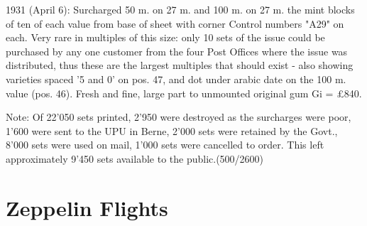 \documentclass[justified]{tufte-book}
\begin{document}






















1931 (April 6): Surcharged 50 m. on 27 m. and 100 m. on 27 m. the mint blocks of ten of each value from base of sheet with corner Control numbers "A29" on each. Very rare in multiples of this size: only 10 sets of the issue could be purchased by any one customer from the four Post Offices where the issue was distributed, thus these are the largest multiples that should exist - also showing varieties spaced '5 and 0' on pos. 47, and dot under arabic date on the 100 m. value (pos. 46). Fresh and fine, large part to unmounted original gum Gi = \pounds{840}. 

Note: Of 22'050 sets printed, 2'950 were destroyed as the surcharges were poor, 1'600 were sent to the UPU in Berne, 2'000 sets were retained by the Govt., 8'000 sets were used on mail, 1'000 sets were cancelled to order. This left approximately 9'450 sets available to the public.(500/2600)

\newpage
\chapter{Zeppelin Flights}


\newpage

\end{document}
